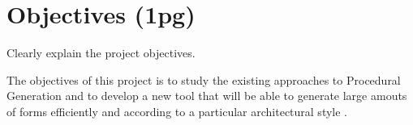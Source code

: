 
% 
% 

\section{Objectives (1pg)}

Clearly explain the project objectives.

The objectives of this project is to study the existing approaches to Procedural Generation and to develop a new tool that will be able to generate large amouts of forms efficiently and according to a particular architectural style .

